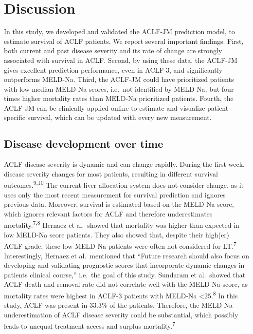 \documentclass[11pt,english,]{book} %
\begin{document}
\linespread{1.213}

\hypertarget{discussion-3}{%
\section*{Discussion}\label{discussion-3}}

In this study, we developed and validated the ACLF-JM prediction model, to estimate survival of ACLF patients. We report several important findings. First, both current and past disease severity and its rate of change are strongly associated with survival in ACLF. Second, by using these data, the ACLF-JM gives excellent prediction performance, even in ACLF-3, and significantly outperforms MELD-Na. Third, the ACLF-JM could have prioritized patients with low median MELD-Na scores, i.e.~not identified by MELD-Na, but four times higher mortality rates than MELD-Na prioritized patients. Fourth, the ACLF-JM can be clinically applied online to estimate and visualize patient-specific survival, which can be updated with every new measurement.

\hypertarget{disease-development-over-time}{%
\subsection*{Disease development over time}\label{disease-development-over-time}}

ACLF disease severity is dynamic and can change rapidly. During the first week, disease severity changes for most patients, resulting in different survival outcomes.\textsuperscript{9,10} The current liver allocation system does not consider change, as it uses only the most recent measurement for survival prediction and ignores previous data. Moreover, survival is estimated based on the MELD-Na score, which ignores relevant factors for ACLF and therefore underestimates mortality.\textsuperscript{7,8} Hernaez et al.~showed that mortality was higher than expected in low MELD-Na score patients. They also showed that, despite their high(er) ACLF grade, these low MELD-Na patients were often not considered for LT.\textsuperscript{7} Interestingly, Hernaez et al.~mentioned that ``Future research should also focus on developing and validating prognostic scores that incorporate dynamic changes in patients clinical course,'' i.e.~the goal of this study. Sundaram et al.~showed that ACLF death and removal rate did not correlate well with the MELD-Na score, as mortality rates were highest in ACLF-3 patients with MELD-Na \textless25.\textsuperscript{8} In this study, ACLF was present in 33.3\% of the patients. Therefore, the MELD-Na underestimation of ACLF disease severity could be substantial, which possibly leads to unequal treatment access and surplus mortality.\textsuperscript{7}
\end{document}
